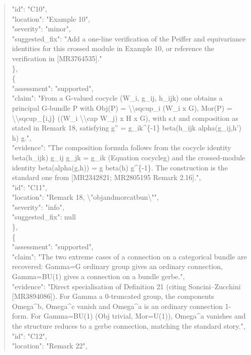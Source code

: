 \documentclass[11pt]{article}
\begin{document}
\begin{quote}
      "id": "C10",\\
      "location": "Example 10",\\
      "severity": "minor",\\
      "suggested\_fix": "Add a one-line verification of the Peiffer and equivariance identities for this crossed module in Example 10, or reference the verification in [MR3764535]."\\
    \},\\
    \{\\
      "assessment": "supported",\\
      "claim": "From a G-valued cocycle (W\_i, g\_ij, h\_ijk) one obtains a principal G-bundle P with Obj(P) = \textbackslash{}\textbackslash{}sqcup\_i (W\_i x G), Mor(P) = \textbackslash{}\textbackslash{}sqcup\_\{i,j\} ((W\_i \textbackslash{}\textbackslash{}cap W\_j) x H x G), with s,t and composition as stated in Remark 18, satisfying g'' = g\_ik\^{}\{-1\} beta(h\_ijk alpha(g\_ij,h') h) g.",\\
      "evidence": "The composition formula follows from the cocycle identity beta(h\_ijk) g\_ij g\_jk = g\_ik (Equation cocycleg) and the crossed-module identity beta(alpha(g,h)) = g beta(h) g\^{}\{-1\}. The construction is the standard one from [MR2342821; MR2805195 Remark 2.16].",\\
      "id": "C11",\\
      "location": "Remark 18, \textbackslash{}"objandmorcatbun\textbackslash{}"",\\
      "severity": "info",\\
      "suggested\_fix": null\\
    \},\\
    \{\\
      "assessment": "supported",\\
      "claim": "The two extreme cases of a connection on a categorical bundle are recovered: Gamma=G ordinary group gives an ordinary connection, Gamma=BU(1) gives a connection on a bundle gerbe.",\\
      "evidence": "Direct specialisation of Definition 21 (citing Soncini--Zucchini [MR3894086]). For Gamma a 0-truncated group, the components Omega\^{}b, Omega\^{}c vanish and Omega\^{}a is an ordinary connection 1-form. For Gamma=BU(1) (Obj trivial, Mor=U(1)), Omega\^{}a vanishes and the structure reduces to a gerbe connection, matching the standard story.",\\
      "id": "C12",\\
      "location": "Remark 22",\\

\end{quote}
\end{document}
